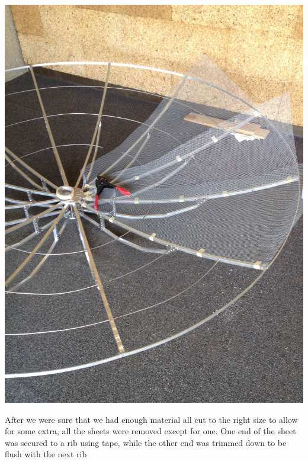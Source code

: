 \documentclass[11pt]{article} %
\begin{document}
\begin{center}
\includegraphics[scale=0.12]{dish/12.jpeg}
\end{center}

After we were sure that we had enough material all cut to the right size to allow for some extra, all the sheets were removed except for one. One end of the sheet was secured to a rib using tape, while the other end was trimmed down to be flush with the next rib
\end{document}
